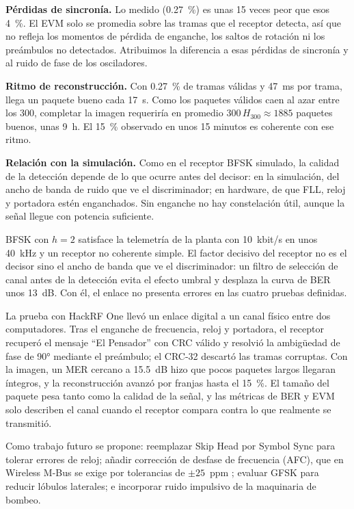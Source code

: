 \documentclass[10pt,twocolumn,letterpaper]{article}
\makeatletter
\renewcommand\section{\@startsection{section}{1}{\z@}{-1.5ex plus -.5ex minus -.2ex}{0.8ex}{\centering\normalfont\scshape}}
\makeatother
\begin{document}
\textbf{Pérdidas de sincronía.} Lo medido (0.27~\%) es unas 15 veces peor que esos 4~\%. El EVM solo se promedia sobre las tramas que el receptor detecta, así que no refleja los momentos de pérdida de enganche, los saltos de rotación ni los preámbulos no detectados. Atribuimos la diferencia a esas pérdidas de sincronía y al ruido de fase de los osciladores.

\textbf{Ritmo de reconstrucción.} Con 0.27~\% de tramas válidas y 47~ms por trama, llega un paquete bueno cada 17~s. Como los paquetes válidos caen al azar entre los 300, completar la imagen requeriría en promedio $300\,H_{300}\approx1885$ paquetes buenos, unas 9~h. El 15~\% observado en unos 15 minutos es coherente con ese ritmo.

\textbf{Relación con la simulación.} Como en el receptor BFSK simulado, la calidad de la detección depende de lo que ocurre antes del decisor: en la simulación, del ancho de banda de ruido que ve el discriminador; en hardware, de que FLL, reloj y portadora estén enganchados. Sin enganche no hay constelación útil, aunque la señal llegue con potencia suficiente.

\section{Conclusiones y trabajo futuro}
BFSK con $h=2$ satisface la telemetría de la planta con 10~kbit/s en unos 40~kHz y un receptor no coherente simple. El factor decisivo del receptor no es el decisor sino el ancho de banda que ve el discriminador: un filtro de selección de canal antes de la detección evita el efecto umbral y desplaza la curva de BER unos 13~dB. Con él, el enlace no presenta errores en las cuatro pruebas definidas.

La prueba con HackRF One llevó un enlace digital a un canal físico entre dos computadores. Tras el enganche de frecuencia, reloj y portadora, el receptor recuperó el mensaje ``El Pensador'' con CRC válido y resolvió la ambigüedad de fase de 90° mediante el preámbulo; el CRC-32 descartó las tramas corruptas. Con la imagen, un MER cercano a 15.5~dB hizo que pocos paquetes largos llegaran íntegros, y la reconstrucción avanzó por franjas hasta el 15~\%. El tamaño del paquete pesa tanto como la calidad de la señal, y las métricas de BER y EVM solo describen el canal cuando el receptor compara contra lo que realmente se transmitió.

Como trabajo futuro se propone: reemplazar Skip Head por Symbol Sync para tolerar errores de reloj; añadir corrección de desfase de frecuencia (AFC), que en Wireless M-Bus se exige por tolerancias de $\pm25$~ppm \cite{an0987}; evaluar GFSK para reducir lóbulos laterales; e incorporar ruido impulsivo de la maquinaria de bombeo.
\end{document}
